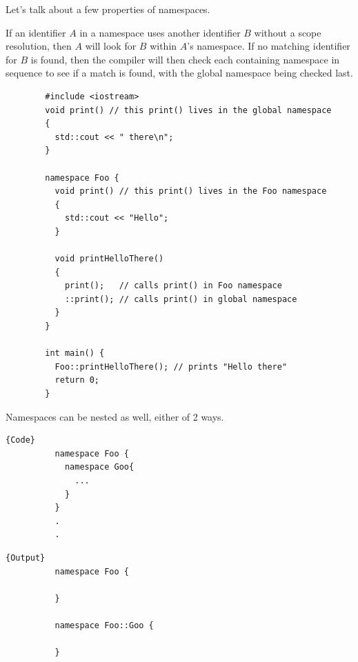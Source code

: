\documentclass{article}
\begin{document}
    Let's talk about a few properties of namespaces. 

    \begin{lemma}
      \label{thm:identifiers-in-parent-namespaces}
      If an identifier $A$ in a namespace uses another identifier $B$ without a scope resolution, then $A$ will look for $B$ within $A$'s namespace. If no matching identifier for $B$ is found, then the compiler will then check each containing namespace in sequence to see if a match is found, with the global namespace being checked last. 

      \begin{lstlisting}
        #include <iostream>
        void print() // this print() lives in the global namespace
        {
          std::cout << " there\n";
        }

        namespace Foo {
          void print() // this print() lives in the Foo namespace
          {
            std::cout << "Hello";
          }

          void printHelloThere()
          {
            print();   // calls print() in Foo namespace
            ::print(); // calls print() in global namespace
          }
        }

        int main() {
          Foo::printHelloThere(); // prints "Hello there" 
          return 0;
        } 
      \end{lstlisting}
    \end{lemma}

    \begin{lemma}
      \label{thm:nested-namespaces}
      Namespaces can be nested as well, either of 2 ways. 

      \noindent\begin{minipage}{.5\textwidth}
        \begin{lstlisting}[]{Code}
          namespace Foo {
            namespace Goo{
              ... 
            }
          }
          .
          .
        \end{lstlisting}
        \end{minipage}
        \hfill
        \begin{minipage}{.49\textwidth}
        \begin{lstlisting}[]{Output}
          namespace Foo {

          }

          namespace Foo::Goo {

          }
        \end{lstlisting}
      \end{minipage}
    \end{lemma}
\end{document}
